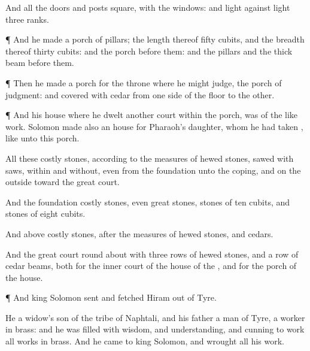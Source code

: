 {And all the
doors and
posts
{}
square, with the
windows: and
light
{}
against
light
{}
three
ranks.


\par }{\PP {}¶ And he
made a
porch of
pillars; the
length thereof
{}
fifty
cubits, and the
breadth thereof
thirty
cubits: and the
porch
{}
before them: and the
{}
pillars and the thick
beam
{} before them.


\par }{\PP {}¶ Then he
made a
porch for the
throne where he might
judge,
{} the
porch of
judgment: and
{}
covered with
cedar from one side of the
floor to the
other.


\par }{\PP {}¶ And his
house where he
dwelt
{}
another
court
within the
porch,
{} was of the like
work.
Solomon
made also an
house for
Pharaoh’s
daughter, whom he had
taken
{}, like unto this
porch.

All these
{}
costly
stones, according to the
measures of hewed
stones,
sawed with
saws,
within and
without, even from the
foundation unto the
coping, and
{} on the
outside toward the
great
court.

And the
foundation
{}
costly
stones, even
great
stones,
stones of
ten
cubits, and
stones of
eight
cubits.

And
above
{}
costly
stones, after the
measures of hewed
stones, and
cedars.

And the
great
court round
about
{} with
three
rows of hewed
stones, and a
row of
cedar
beams, both for the
inner
court of the
house of the
{}, and for the
porch of the
house.


\par }{\PP {}¶ And
king
Solomon
sent and
fetched
Hiram out of
Tyre.

He
{} a
widow’s
son of the
tribe of
Naphtali, and his
father
{} a
man of
Tyre, a
worker in
brass: and he was
filled with
wisdom, and
understanding, and
cunning to
work all
works in
brass. And he
came to
king
Solomon, and
wrought all his
work.

}
